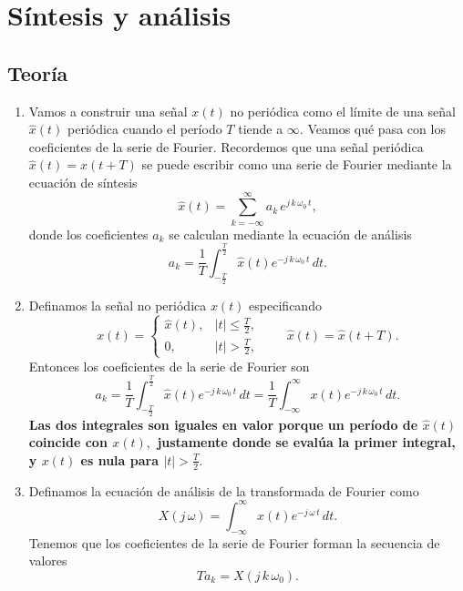 \documentclass[11pt,a4paper,openany]{book}
\begin{document}
\section{Síntesis y análisis}

\subsection{Teoría}

\begin{enumerate}
	
	\item Vamos a construir una señal $x(t)$ no periódica como el límite de una señal $\hat{x}(t)$ periódica cuando el período $T$ tiende a $\infty$. Veamos qué pasa con los coeficientes de la serie de Fourier. Recordemos que una señal periódica $\hat{x}(t) = \hat{x}(t+T)$ se puede escribir como una serie de Fourier mediante la ecuación de síntesis 
	\begin{equation}
		\hat{x}(t) = \sum_{k=-\infty}^{\infty} a_{k} \, e^{j \, k \, \omega_{0} \, t},
	\end{equation}
	donde los coeficientes $a_{k}$ se calculan mediante la ecuación de análisis 
	\begin{equation}
		a_{k} = \frac{1}{T} \int_{-\frac{T}{2}}^{\frac{T}{2}} \hat{x}(t) e^{-j \, k \, \omega_{0} \, t} \, dt.
	\end{equation}
	
	\item Definamos la señal no periódica $x(t)$ especificando 
	\begin{equation}
		x(t) = \begin{cases}
			\hat{x}(t), & |t| \leq \frac{T}{2}, \\
			0, & |t| > \frac{T}{2},
		\end{cases}
		\qquad
		\hat{x}(t) = \hat{x}(t+T) .
	\end{equation}
	Entonces los coeficientes de la serie de Fourier son 
	\begin{equation}
		a_{k} = \frac{1}{T} \int_{-\frac{T}{2}}^{\frac{T}{2}} \hat{x}(t) e^{-j \, k \, \omega_{0} \, t} \, dt = \frac{1}{T} \int_{-\infty}^{\infty} x(t) e^{-j \, k \, \omega_{0} \, t} \, dt.
	\end{equation}
	\textbf{Las dos integrales son iguales en valor porque un período de $\hat{x}(t)$ coincide con $x(t),$ justamente donde se evalúa la primer integral, y $x(t)$ es nula para $|t| > \frac{T}{2}.$}
	
	\item Definamos la ecuación de análisis de la transformada de Fourier como 
	\begin{equation}
		X(j \, \omega) = \int_{-\infty}^{\infty} x(t) e^{-j \, \omega \, t} \, dt.
	\end{equation}
	Tenemos que los coeficientes de la serie de Fourier forman la secuencia de valores 
	\begin{equation}
		T a_{k} = X(j \, k \, \omega_{0}) .
	\end{equation}
	

\end{enumerate}
\end{document}
